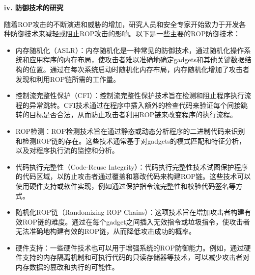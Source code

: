 \documentclass[UTF8,12pt,a4paper]{ctexart}
\numberwithin{figure}{section}
\begin{document}
\textbf{iv. 防御技术的研究}
\par 随着ROP攻击的不断演进和威胁的增加，研究人员和安全专家开始致力于开发各种防御技术来减轻或阻止ROP攻击的影响。以下是一些主要的ROP防御技术：
\begin{itemize}
    \item 内存随机化（ASLR）：内存随机化是一种常见的防御技术，通过随机化操作系统和应用程序的内存布局，使攻击者难以准确地确定gadgets和其他关键数据结构的位置。通过在每次系统启动时随机化内存布局，内存随机化增加了攻击者发现和利用ROP链所需的工作量。
    \item 控制流完整性保护（CFI）：控制流完整性保护技术旨在检测和阻止程序执行流程的异常跳转。CFI技术通过在程序中插入额外的检查代码来验证每个间接跳转的目标是否合法，从而防止攻击者利用ROP链来改变程序的执行流程。
    \item ROP检测：ROP检测技术旨在通过静态或动态分析程序的二进制代码来识别和检测ROP链的存在。这些技术通常基于对gadgets的模式匹配和特征分析，以及对程序执行流的监控和分析。
    \item 代码执行完整性（Code-Reuse Integrity）：代码执行完整性技术试图保护程序的代码区域，以防止攻击者通过覆盖和篡改代码来构建ROP链。这些技术可以使用硬件支持或软件实现，例如通过保护指令流完整性和校验代码签名等方式。
    \item 随机化ROP链（Randomizing ROP Chains）：这项技术旨在增加攻击者构建有效ROP链的难度。通过在每个gadget之间插入无效指令或垃圾指令，使攻击者无法准确地构建有效的ROP链，从而降低攻击成功的概率。
    \item 硬件支持：一些硬件技术也可以用于增强系统的ROP防御能力。例如，通过硬件支持的内存隔离机制和可执行代码的只读存储器等技术，可以减少攻击者对内存数据的篡改和执行的可能性。
\end{itemize}
\end{document}

